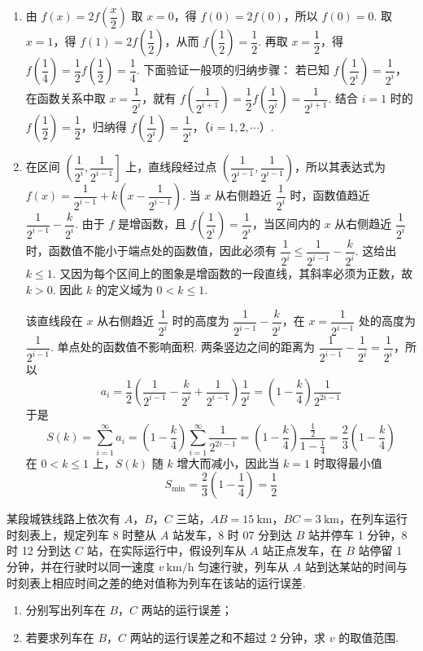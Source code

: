 \begin{solution}
\begin{enumerate}
\item
由 \(f(x)=2f\left(\dfrac{x}{2}\right)\) 取 \(x=0\)，得 \(f(0)=2f(0)\)，所以 \(f(0)=0\). 取 \(x=1\)，得 \(f(1)=2f\left(\dfrac12\right)\)，从而 \(f\left(\dfrac12\right)=\dfrac12\). 再取 \(x=\dfrac12\)，得 \(f\left(\dfrac14\right)=\dfrac12f\left(\dfrac12\right)=\dfrac14\). 下面验证一般项的归纳步骤：
若已知 \(f\left(\dfrac1{2^i}\right)=\dfrac1{2^i}\)，在函数关系中取
\(x=\dfrac1{2^i}\)，就有
\(f\left(\dfrac1{2^{i+1}}\right)=\dfrac12f\left(\dfrac1{2^i}\right)=\dfrac1{2^{i+1}}\).
结合 \(i=1\) 时的 \(f\left(\dfrac12\right)=\dfrac12\)，归纳得
\(f\left(\dfrac1{2^i}\right)=\dfrac1{2^i}\)，（\(i=1,2,\cdots\)）.

\item
在区间 \(\left(\dfrac1{2^i},\dfrac1{2^{i-1}}\right]\) 上，直线段经过点 \(\left(\dfrac1{2^{i-1}},\dfrac1{2^{i-1}}\right)\)，所以其表达式为
\(f(x)=\dfrac1{2^{i-1}}+k\left(x-\dfrac1{2^{i-1}}\right)\).
当 \(x\) 从右侧趋近 \(\dfrac1{2^i}\) 时，函数值趋近
\(\dfrac1{2^{i-1}}-\dfrac{k}{2^i}\).
由于 \(f\) 是增函数，且 \(f\left(\dfrac1{2^i}\right)=\dfrac1{2^i}\)，当区间内的 \(x\) 从右侧趋近 \(\dfrac1{2^i}\) 时，函数值不能小于端点处的函数值，因此必须有
\(\dfrac1{2^i}\leqslant\dfrac1{2^{i-1}}-\dfrac{k}{2^i}\). 这给出 \(k\leqslant1\). 又因为每个区间上的图象是增函数的一段直线，其斜率必须为正数，故 \(k>0\). 因此 \(k\) 的定义域为 \(0<k\leqslant1\).

该直线段在 \(x\) 从右侧趋近 \(\dfrac1{2^i}\) 时的高度为 \(\dfrac1{2^{i-1}}-\dfrac{k}{2^i}\)，在 \(x=\dfrac1{2^{i-1}}\) 处的高度为 \(\dfrac1{2^{i-1}}\). 单点处的函数值不影响面积. 两条竖边之间的距离为 \(\dfrac1{2^{i-1}}-\dfrac1{2^i}=\dfrac1{2^i}\)，所以
\[
a_i=\dfrac12\left(\dfrac1{2^{i-1}}-\dfrac{k}{2^i}+\dfrac1{2^{i-1}}\right)\dfrac1{2^i}
=\left(1-\dfrac{k}{4}\right)\dfrac1{2^{2i-1}}
\]
于是
\[
S(k)=\sum_{i=1}^{\infty}a_i
=\left(1-\dfrac{k}{4}\right)\sum_{i=1}^{\infty}\dfrac1{2^{2i-1}}
=\left(1-\dfrac{k}{4}\right)\frac{\frac{1}{2}}{1-\frac{1}{4}}
=\dfrac23\left(1-\dfrac{k}{4}\right)
\]
在 \(0<k\leqslant1\) 上，\(S(k)\) 随 \(k\) 增大而减小，因此当 \(k=1\) 时取得最小值
\[
S_{\min}=\dfrac23\left(1-\dfrac14\right)=\dfrac12
\]
\end{enumerate}
\end{solution}

\begin{problem}
某段城铁线路上依次有 \(A\)，\(B\)，\(C\) 三站，\(AB=15\mathrm{~km}\)，\(BC=3\mathrm{~km}\)，在列车运行时刻表上，规定列车 8 时整从 \(A\) 站发车，8 时 07 分到达 \(B\) 站并停车 1 分钟，8 时 12 分到达 \(C\) 站，在实际运行中，假设列车从 \(A\) 站正点发车，在 \(B\) 站停留 1 分钟，并在行驶时以同一速度 \(v\mathrm{~km/h}\) 匀速行驶，列车从 \(A\) 站到达某站的时间与时刻表上相应时间之差的绝对值称为列车在该站的运行误差.

\begin{enumerate}
\item 分别写出列车在 \(B\)，\(C\) 两站的运行误差；
\item 若要求列车在 \(B\)，\(C\) 两站的运行误差之和不超过 2 分钟，求 \(v\) 的取值范围.
\end{enumerate}
\end{problem}

